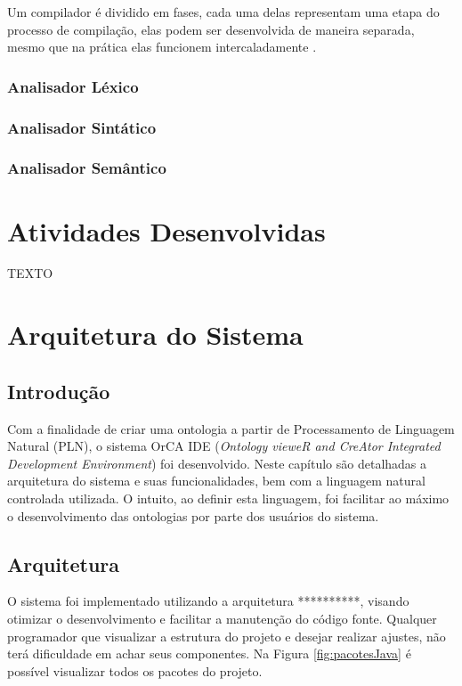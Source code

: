 \documentclass{bcc}
\begin{document}
Um compilador é dividido em fases, cada uma delas representam uma etapa do processo de compilação, elas podem ser desenvolvida de maneira separada, mesmo que na prática elas funcionem intercaladamente \cite{foleiss2009}.

\subsection{Analisador Léxico}

\subsection{Analisador Sintático}

\subsection{Analisador Semântico}

\chapter{Atividades Desenvolvidas}
\label{chap:atividades}

TEXTO

\chapter{Arquitetura do Sistema}
\label{chap:sistema}

\section{Introdução}
Com a finalidade de criar uma ontologia a partir de  Processamento de Linguagem Natural (PLN), o sistema OrCA IDE (\textit{Ontology vieweR and CreAtor Integrated Development Environment}) foi desenvolvido. Neste capítulo são detalhadas a arquitetura do sistema e suas funcionalidades, bem com a linguagem natural controlada utilizada. O intuito, ao definir esta linguagem, foi facilitar ao máximo o desenvolvimento das ontologias por parte dos usuários do sistema.

\section{Arquitetura}

O sistema foi implementado utilizando a arquitetura **********, visando otimizar o desenvolvimento e facilitar a manutenção do código fonte. Qualquer programador que visualizar a estrutura do projeto e desejar realizar ajustes, não terá dificuldade em achar seus componentes. Na Figura \ref{fig:pacotesJava} é possível visualizar todos os pacotes do projeto.
\end{document}
